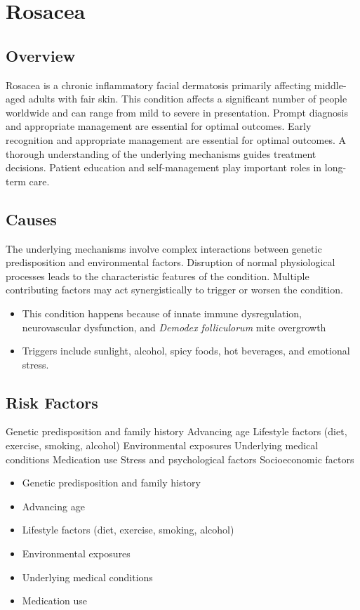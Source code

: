 \chapter{Rosacea}
\label{sec:Rosacea}

\section{Overview}
Rosacea is a chronic inflammatory facial dermatosis primarily affecting middle-aged adults with fair skin. This condition affects a significant number of people worldwide and can range from mild to severe in presentation. Prompt diagnosis and appropriate management are essential for optimal outcomes. Early recognition and appropriate management are essential for optimal outcomes. A thorough understanding of the underlying mechanisms guides treatment decisions. Patient education and self-management play important roles in long-term care.
\section{Causes}
The underlying mechanisms involve complex interactions between genetic predisposition and environmental factors. Disruption of normal physiological processes leads to the characteristic features of the condition. Multiple contributing factors may act synergistically to trigger or worsen the condition.

\begin{itemize}[noitemsep]
  \item This condition happens because of innate immune dysregulation, neurovascular dysfunction, and \textit{Demodex folliculorum} mite overgrowth
  \item Triggers include sunlight, alcohol, spicy foods, hot beverages, and emotional stress.
\end{itemize}
\section{Risk Factors}
Genetic predisposition and family history Advancing age Lifestyle factors (diet, exercise, smoking, alcohol) Environmental exposures Underlying medical conditions Medication use Stress and psychological factors Socioeconomic factors

\begin{itemize}[noitemsep]
  \item Genetic predisposition and family history
  \item Advancing age
  \item Lifestyle factors (diet, exercise, smoking, alcohol)
  \item Environmental exposures
  \item Underlying medical conditions
  \item Medication use
\end{itemize}
